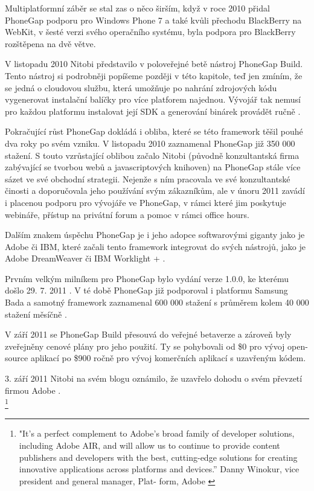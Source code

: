 Multiplatformní záběr se stal zas o něco širším, když v roce 2010 přidal PhoneGap podporu pro Windows Phone 7 a také kvůli přechodu BlackBerry na WebKit, v šesté verzi svého operačního systému, byla podpora pro BlackBerry rozštěpena na dvě větve.

V listopadu 2010 Nitobi představilo v poloveřejné betě nástroj PhoneGap Build. Tento nástroj si podrobněji popíšeme později v této kapitole, teď jen zmíním, že se jedná o cloudovou službu, která umožňuje po nahrání zdrojových kódu vygenerovat instalační balíčky pro více platforem najednou. Vývojář tak nemusí pro každou platformu instalovat její SDK a generování binárek provádět ručně \cite{announcing_phonegap_build_beta}. 

Pokračující růst PhoneGap dokládá i obliba, které se této framework těšil pouhé dva roky po svém vzniku. V listopadu 2010 zaznamenal PhoneGap již 350 000 stažení. S touto vzrůstající oblibou začalo Nitobi (původně konzultantská firma zabývající se tvorbou webů a javascriptových knihoven) na PhoneGap stále více sázet ve své obchodní strategii. Nejenže s ním pracovala ve své konzultantské činosti a doporučovala jeho používání svým zákazníkům, ale v únoru 2011 zavádí i placenou podporu pro vývojáře ve PhoneGap, v rámci které jim poskytuje webináře, přístup na privátní forum a pomoc v rámci office hours.

Dalším znakem úspěchu PhoneGap je i jeho adopce softwarovými giganty jako je Adobe či IBM, které začali tento framework integrovat do svých nástrojů, jako je Adobe DreamWeaver či IBM Worklight \cite{phonegap_worklight_enterprise} + \cite{dreamweaver_supports_phonegap}. 

Prvním velkým milníkem pro PhoneGap bylo vydání verze 1.0.0, ke kterému došlo 29. 7. 2011 \cite{phonegap_1_released}. V té době PhoneGap již podporoval i platformu Samsung Bada a samotný framework zaznamenal 600 000 stažení s průměrem kolem 40 000 stažení měsíčně \cite{phonegap_1_released}. 

V září 2011 se PhoneGap Build přesouvá do veřejné betaverze a zároveň byly zveřejněny cenové plány pro jeho použití. Ty se pohybovali od \$0 pro vývoj open-source aplikací po \$900 ročně pro vývoj komerčních aplikací s uzavřeným kódem. \cite{phonegap_build_open_beta}

3. září 2011 Nitobi na svém blogu oznámilo, že uzavřelo dohodu o svém převzetí firmou Adobe \cite{nitobi_adobe1}. \\

\textit{} \cite{nitobi_adobe1}
\footnote{"It’s a perfect complement to Adobe’s broad family of developer solutions, including Adobe AIR, and will allow us to continue to provide content publishers and developers with the best, cutting-edge solutions for creating innovative applications across platforms and devices.” Danny Winokur, vice president and general manager, Plat-
form, Adobe \cite{nitobi_adobe1}}\\

